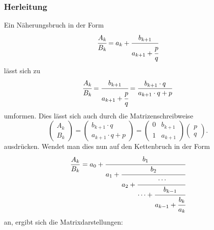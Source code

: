 \subsubsection{Herleitung}
Ein Näherungsbruch in der Form
\begin{align*}
	\cfrac{A_k}{B_k} = a_k + \cfrac{b_{k + 1}}{a_{k + 1} + \cfrac{p}{q}}
\end{align*}
lässt sich zu
\begin{align*}
	\cfrac{A_k}{B_k} = \cfrac{b_{k+1}}{a_{k+1} + \cfrac{p}{q}} = \frac{b_{k+1} \cdot q}{a_{k+1} \cdot q + p}
\end{align*}
umformen.
Dies lässt sich auch durch die Matrizenschreibweise
\begin{equation*}
	\begin{pmatrix}
		A_k\\
		B_k
	\end{pmatrix}
	= 		\begin{pmatrix}
		b_{k+1} \cdot q\\
		a_{k+1} \cdot q + p
	\end{pmatrix}
	=\begin{pmatrix}
		0&	b_{k+1}\\
		1&	a_{k+1}
	\end{pmatrix}
	\begin{pmatrix}
		p \\
		q
	\end{pmatrix}.
\end{equation*}
ausdrücken.
Wendet man dies nun auf den Kettenbruch in der Form
\begin{equation*}
	\frac{A_k}{B_k} = a_0 + \cfrac{b_1}{a_1+\cfrac{b_2}{a_2+\cfrac{\cdots}{\cdots+\cfrac{b_{k-1}}{a_{k-1} + \cfrac{b_k}{a_k}}}}}
\end{equation*}
an, ergibt sich die Matrixdarstellungen:

